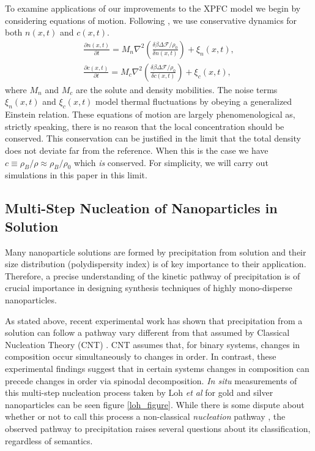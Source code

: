 \documentclass[showkeys, prb, reprint]{revtex4-1}
\renewcommand{\d}{\delta}       %
\newcommand{\F}{\mathcal{F}}    %
\renewcommand{\l}{\left}        %
\renewcommand{\r}{\right}       %
\newcommand{\f}{\frac}          %
\newcommand{\B}{\rho_B}         %
\begin{document}
To examine applications of our improvements to the XPFC model we begin by
considering equations of motion. Following \cite{GREENWOOD11_BINARY}, we use
conservative dynamics for both $n(x, t)$ and $c(x, t)$.
%
\begin{gather}
    \f{\partial n(x, t)}{\partial t} = 
        M_n \nabla^2\l(\f{\d \beta \Delta\F / \rho_0}{\d n(x, t)}\r) 
        + \xi_n(x, t), \\ 
    \f{\partial c(x, t)}{\partial t} = 
        M_c \nabla^2\l(\f{\d \beta \Delta \F / \rho_0}{\d c(x, t)}\r)
        + \xi_c(x, t),
\end{gather}
%
where $M_n$ and $M_c$ are the solute and density mobilities. The noise terms
$\xi_n(x, t)$ and $\xi_c(x, t)$ model thermal fluctuations by obeying a
generalized Einstein relation. These equations of motion are largely
phenomenological as, strictly speaking, there is no reason that the local
concentration should be conserved.  This conservation can be justified in the
limit that the total density does not deviate far from the reference. When this
is the case we have $c \equiv \B / \rho \approx \B / \rho_0$ which \textit{is}
conserved. For simplicity, we will carry out simulations in this paper in this
limit.

\subsection{Multi-Step Nucleation of Nanoparticles in Solution} %


Many nanoparticle solutions are formed by precipitation from solution and their
size distribution (polydispersity index) is of key importance to their
application. Therefore, a precise understanding of the kinetic pathway of
precipitation is of crucial importance in designing synthesis techniques of
highly mono-disperse nanoparticles.

As stated above, recent experimental work has shown that precipitation from a
solution can follow a pathway vary different from that assumed by Classical
Nucleation Theory (CNT) \cite{LOH17, WALLACE13}. CNT assumes that, for binary
systems, changes in composition occur simultaneously to changes in order. In
contrast, these experimental findings suggest that in certain systems changes
in composition can precede changes in order via spinodal decomposition.
\textit{In situ} measurements of this multi-step nucleation process taken by
Loh \textit{et al}\cite{LOH17} for gold and silver nanoparticles can be seen
figure \ref{loh_figure}. While there is some dispute about whether or not to
call this process a non-classical \textit{nucleation} pathway \cite{DAVEY13,
GEBAUER11}, the observed pathway to precipitation raises several questions
about its classification, regardless of semantics.
\end{document}
